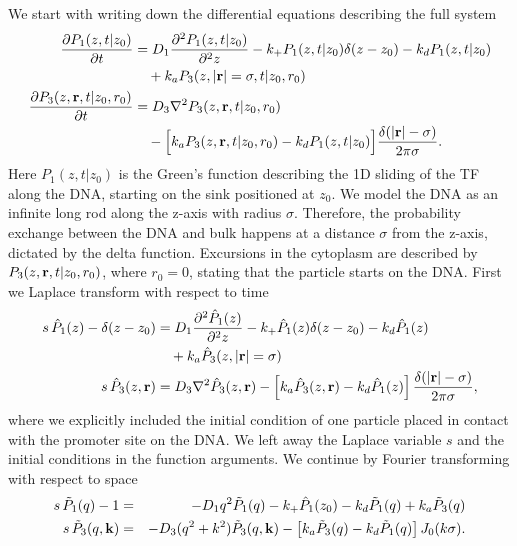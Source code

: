 We start with writing down the differential equations describing the full system
\setlength{\jot}{12pt}
\begin{equation}
\elabel{DE_full}
\begin{split}
\pdiff{P_{1}(z,t|z_0)}{t} & = D_1 \frac{\partial^2 P_{1}(z,t|z_0)}{\partial^2 z} - k_+ P_{1}(z,t|z_0) \delta(z - z_0) - k_d P_{1}(z,t|z_0) \\
 & \quad + k_a P_{3}(z, |{\bf r}| = \sigma, t|z_0, r_0) \\
\pdiff{P_{3}(z,{\bf r},t|z_0,r_0)}{t} & = D_3 \nabla^2 P_{3}(z, {\bf r}, t|z_0,r_0) \\
 & \quad - \Big[ k_a P_{3}(z, {\bf r}, t|z_0,r_0) - k_d P_{1}(z,t|z_0) \Big] \frac{\delta(|{\bf r}| - \sigma)}{2 \pi \sigma}.
\end{split}
\end{equation}
Here $P_1(z, t|z_0)$ is the Green's function describing the 1D sliding of the TF along the DNA, starting on the sink positioned at $z_0$. We model the DNA as an infinite long rod along the z-axis with radius $\sigma$. Therefore, the probability exchange between the DNA and bulk happens at a distance $\sigma$ from the z-axis, dictated by the delta function. Excursions in the cytoplasm are described by $P_3(z, {\bf r}, t|z_0,r_0)$, where $r_0=0$, stating that the particle starts on the DNA. First we Laplace transform with respect to time
\begin{eqnarray}
\begin{split}
 s \, \hat{P}_{1}(z) - \delta(z - z_0) & = D_1 \frac{\partial^2\hat{P}_1(z)}{\partial^2 z}  - k_+ \hat{P}_1(z) \delta(z - z_0) - k_d \hat{P}_1(z) \\
 & \quad + k_a \hat{P}_3(z, |{\bf r}| = \sigma) \\
 s \, \hat{P}_3(z,{\mathbf r}) & = D_3 \nabla^2 \hat{P}_3(z, {\bf r}) - \left[ k_a \hat{P}_3(z,{\bf r}) - k_d \hat{P}_1(z) \right] \frac{\delta(|{\bf r}| - \sigma)}{2 \pi \sigma},
\end{split}
\end{eqnarray}
where we explicitly included the initial condition of one particle placed in contact with the promoter site on the DNA. We left away the Laplace variable $s$ and the initial conditions in the function arguments. We continue by Fourier transforming with respect to space
\begin{eqnarray}
 s \, \tilde{P}_1(q) - 1 & = & - D_1 q^2 \tilde{P}_1(q) - k_+ \hat{P}_1(z_0) - k_d \tilde{P}_1(q) + k_a \tilde{P}_3(q) \elabel{FDE_dna} \\
 s \, \tilde{P}_3(q,{\bf k}) & = & - D_3 (q^2 + k^2) \tilde{P}_3(q, {\bf k}) - \left[ k_a \tilde{P}_3(q) - k_d \tilde{P}_1(q) \right] J_{0}(k \sigma). 
 \elabel{FDE_bulk}
\end{eqnarray}
